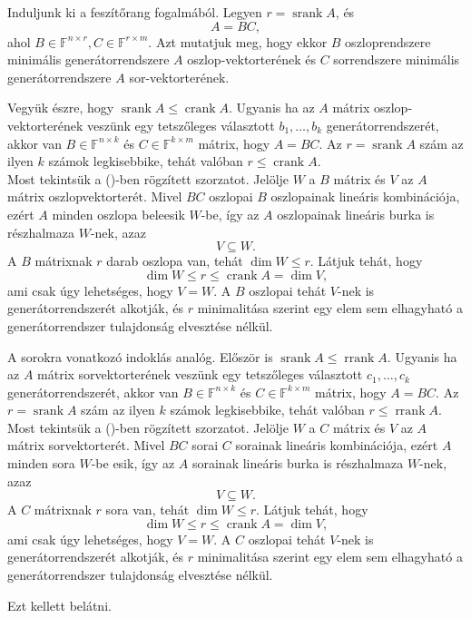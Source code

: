 \documentclass[9pt, a4paper, showtrims]{memoir}
\makeatletter
\renewenvironment{proof}[1][\proofname]
    {\par\pushQED{\qed}%
    \normalfont \topsep6\p@\@plus6\p@\relax
    \trivlist
    \item[\hskip\labelsep
        \itshape
    #1\@addpunct{:}]\ignorespaces}
    {\popQED\endtrivlist\@endpefalse}
\theoremstyle{plain}
\theoremstyle{remark}
\theoremstyle{definition}
\DeclareMathOperator{\crank}{crank}
\DeclareMathOperator{\rrank}{rrank}
\DeclareMathOperator{\srank}{srank}
\makeatother
\begin{document}
\begin{proof}
    Induljunk ki a feszítőrang fogalmából.
    Legyen $r=\srank{A}$, és 
    \[
        A=BC,\tag{\dag}
    \]
    ahol $B\in\mathbb{F}^{n\times r},C\in\mathbb{F}^{r\times m}$.
    Azt mutatjuk meg, hogy ekkor $B$ oszloprendszere minimális generátorrendszere $A$ oszlop-vektorterének
    és $C$ sorrendszere minimális generátorrendszere $A$ sor-vektorterének.

    Vegyük észre, hogy $\srank{A}\leq \crank{A}$.
    Ugyanis ha az $A$ mátrix oszlop-vektorterének veszünk egy tetszőleges választott
    $b_1,\dots,b_k$ generátorrendszerét, 
    akkor van $B\in\mathbb{F}^{n\times k}$ és $C\in\mathbb{F}^{k\times m}$ mátrix, hogy $A=BC$.
    Az $r=\srank{A}$ szám az ilyen $k$ számok legkisebbike, tehát valóban $r\leq\crank{A}$.
    \\
    Most tekintsük a (\dag)-ben rögzített szorzatot.
    Jelölje $W$ a $B$ mátrix és $V$ az $A$ mátrix oszlopvektorterét.
    Mivel $BC$ oszlopai $B$ oszlopainak lineáris kombinációja, 
    ezért $A$ minden oszlopa beleesik $W$-be, 
    így az $A$ oszlopainak lineáris burka is részhalmaza $W$-nek,
    azaz 
    \[
        V\subseteq W.
    \]
    A $B$ mátrixnak $r$ darab oszlopa van, 
    tehát $\dim W\leq r$.
    Látjuk tehát, hogy 
    \[\dim W\leq r\leq\crank{A}=\dim V,
    \]
    ami csak úgy lehetséges, 
    hogy $V=W$.
    A $B$ oszlopai tehát $V$-nek is generátorrendszerét alkotják,
    és $r$ minimalitása szerint egy elem sem elhagyható a generátorrendszer tulajdonság
    elvesztése nélkül.

    A sorokra vonatkozó indoklás analóg.
    Először is $\srank{A}\leq \rrank{A}$.
    Ugyanis ha az $A$ mátrix sorvektorterének veszünk egy tetszőleges választott
    $c_1,\dots,c_k$ generátorrendszerét, 
    akkor van $B\in\mathbb{F}^{n\times k}$ és $C\in\mathbb{F}^{k\times m}$ mátrix, hogy $A=BC$.
    Az $r=\srank{A}$ szám az ilyen $k$ számok legkisebbike, tehát valóban $r\leq\rrank{A}$.
    \\
    Most tekintsük a (\dag)-ben rögzített szorzatot.
    Jelölje $W$ a $C$ mátrix és $V$ az $A$ mátrix sorvektorterét.
    Mivel $BC$ sorai $C$ sorainak lineáris kombinációja, 
    ezért $A$ minden sora $W$-be esik,
    így az $A$ sorainak lineáris burka is részhalmaza $W$-nek,
    azaz 
    \[
        V\subseteq W.
    \]
    A $C$ mátrixnak $r$ sora van, 
    tehát $\dim W\leq r$.
    Látjuk tehát, hogy 
    \[\dim W\leq r\leq\crank{A}=\dim V,
    \]
    ami csak úgy lehetséges, 
    hogy $V=W$.
    A $C$ oszlopai tehát $V$-nek is generátorrendszerét alkotják,
    és $r$ minimalitása szerint egy elem sem elhagyható a generátorrendszer tulajdonság
    elvesztése nélkül.

    Ezt kellett belátni. 
\end{proof}
\end{document}
